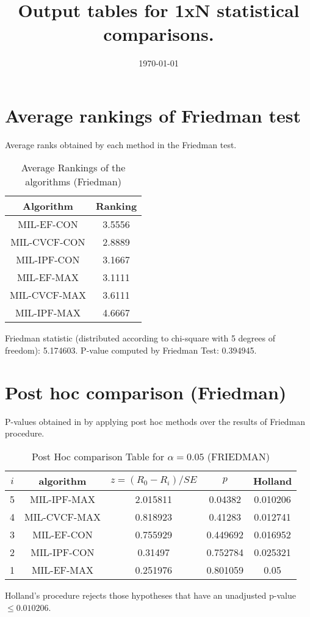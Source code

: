 \documentclass[a4paper,10pt]{article}
\title{Output tables for 1xN statistical comparisons.}
\author{}
\date{\today}
\begin{document}
\begin{landscape}
\pagestyle{empty}
\maketitle
\thispagestyle{empty}

\section{Average rankings of Friedman test}


Average ranks obtained by each method in the Friedman test.

\begin{table}[!htp]
\centering
\begin{tabular}{|c|c|}\hline
Algorithm&Ranking\\\hline
MIL-EF-CON&3.5556\\MIL-CVCF-CON&2.8889\\MIL-IPF-CON&3.1667\\MIL-EF-MAX&3.1111\\MIL-CVCF-MAX&3.6111\\MIL-IPF-MAX&4.6667\\\hline\end{tabular}
\caption{Average Rankings of the algorithms (Friedman)}
\end{table}

Friedman statistic (distributed according to chi-square with 5 degrees of freedom): 5.174603. \newline P-value computed by Friedman Test: 0.394945.\newline


\newpage

\section{Post hoc comparison (Friedman)}


P-values obtained in by applying post hoc methods over the results of Friedman procedure.

\begin{table}[!htp]
\centering\footnotesize
\begin{tabular}{ccccc}
$i$&algorithm&$z=(R_0 - R_i)/SE$&$p$&Holland\\
\hline5&MIL-IPF-MAX&2.015811&0.04382&0.010206\\4&MIL-CVCF-MAX&0.818923&0.41283&0.012741\\3&MIL-EF-CON&0.755929&0.449692&0.016952\\2&MIL-IPF-CON&0.31497&0.752784&0.025321\\1&MIL-EF-MAX&0.251976&0.801059&0.05\\\hline
\end{tabular}
\caption{Post Hoc comparison Table for $\alpha=0.05$ (FRIEDMAN)}
\end{table}Holland's procedure rejects those hypotheses that have an unadjusted p-value $\le0.010206$.



\end{landscape}
\end{document}

